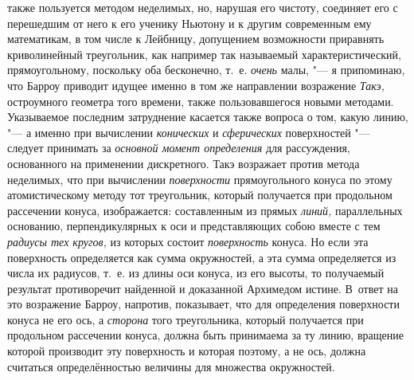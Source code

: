 также пользуется методом неделимых, но, нарушая его чистоту, соединяет его с
перешедшим от него к его ученику Ньютону и к другим современным ему
математикам, в том числе к Лейбницу, допущением возможности приравнять
криволинейный треугольник, как например так называемый характеристический,
прямоугольному, поскольку оба бесконечно, т.~е. {\em очень} малы, "--- я
припоминаю, что Барроу приводит идущее именно в том же направлении возражение
{\em Такэ,} остроумного геометра того времени, также пользовавшегося новыми
методами. Указываемое последним затруднение касается также вопроса о том, какую
линию, "--- а именно при вычислении {\em конических} и {\em сферических}
поверхностей "--- следует принимать за {\em основной момент определения} для
рассуждения, основанного на применении дискретного. Такэ возражает против
метода неделимых, что при вычислении {\em поверхности} прямоугольного конуса по
этому атомистическому методу тот треугольник, который получается при продольном
рассечении конуса, изображается: составленным из прямых {\em линий,}
параллельных основанию, перпендикулярных к оси и представляющих собою вместе с
тем {\em радиусы тех кругов,} из которых состоит {\em поверхность} конуса. Но
если эта поверхность определяется как сумма окружностей, а эта сумма
определяется из числа их радиусов, т.~е. из длины оси конуса, из его высоты, то
получаемый результат противоречит найденной и доказанной Архимедом истине.
В~ответ на это возражение Барроу, напротив, показывает, что для определения
поверхности конуса не его ось, а {\em сторона} того треугольника, который
получается при продольном рассечении конуса, должна быть принимаема за ту
линию, вращение которой производит эту поверхность и которая поэтому, а не ось,
должна считаться определённостью величины для множества окружностей.

